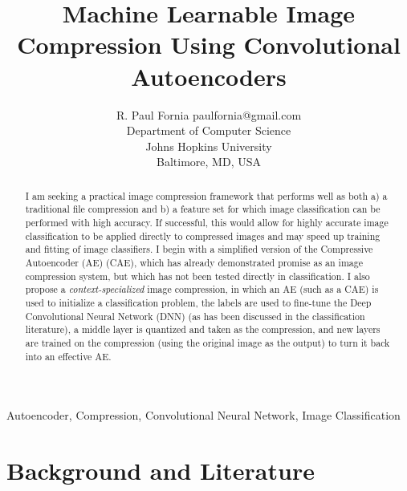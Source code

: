 \documentclass[twoside,11pt]{article}
\begin{document}
\title{Machine Learnable Image Compression Using Convolutional Autoencoders}

\author{\name R. Paul Fornia \email paulfornia@gmail.com \\
       \addr Department of Computer Science\\
       Johns Hopkins University\\
       Baltimore, MD, USA
       }


\maketitle

\begin{abstract}%
I am seeking a practical image compression framework that performs well as both 
a) a traditional file compression and b) a feature set for which image 
classification can be performed with high accuracy. If successful, this would 
allow for highly accurate image classification to be applied directly to compressed 
images and may speed up training and fitting of image classifiers. I 
begin with a simplified version of the Compressive Autoencoder (AE) (CAE), 
which has already demonstrated 
promise as an image compression system, but which has not been tested directly 
in classification. I also propose a \emph{context-specialized} image compression, in
which an AE (such as a CAE) is used to initialize a classification problem, the 
labels are used to fine-tune the Deep Convolutional Neural Network (DNN)
 (as has been discussed in the classification
literature), a middle layer is quantized and taken as the compression, and new 
layers are trained on the compression (using the original image as the output) 
to turn it back into an effective AE.
\end{abstract}

\begin{keywords}
    Autoencoder, Compression, Convolutional Neural Network, Image Classification
\end{keywords}




\section{Background and Literature}
\end{document}
